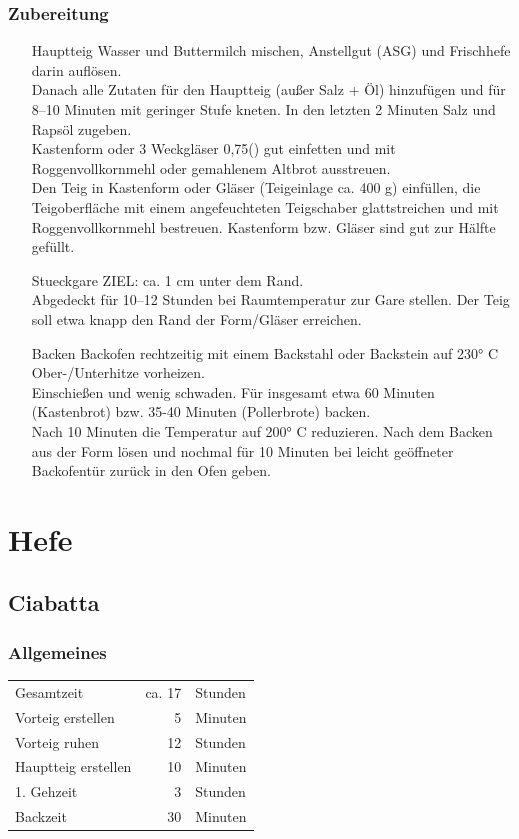 \subsection*{Zubereitung}
\begin{enumerate}
    \item  [\Gls{Hauptteig}]  Wasser und Buttermilch mischen, Anstellgut (ASG) und Frischhefe darin auflösen.\\
    Danach alle Zutaten für den Hauptteig (außer Salz + Öl) hinzufügen und für 8–10     Minuten mit geringer Stufe kneten. In den letzten 2  Minuten Salz und Rapsöl zugeben.\\
    Kastenform oder 3 Weckgläser 0,75() gut einfetten und mit Roggenvollkornmehl oder gemahlenem Altbrot ausstreuen.\\
    Den Teig in Kastenform oder Gläser (Teigeinlage ca. 400 g) einfüllen, die Teigoberfläche mit einem angefeuchteten Teigschaber glattstreichen und mit Roggenvollkornmehl bestreuen. Kastenform bzw. Gläser sind gut zur Hälfte gefüllt.
    \item [\Gls{Stueckgare}] ZIEL: ca. 1 cm unter dem Rand. \\
    Abgedeckt für 10–12 Stunden bei Raumtemperatur zur Gare stellen. Der Teig soll etwa knapp den Rand der Form/Gläser erreichen.
    \item [Backen]  Backofen rechtzeitig mit einem Backstahl oder Backstein auf 230° C Ober-/Unterhitze vorheizen.\\
    Einschießen und wenig schwaden. Für insgesamt etwa 60 Minuten (Kastenbrot) bzw. 35-40 Minuten (Pollerbrote) backen.\\
    Nach 10 Minuten die Temperatur auf 200° C reduzieren. Nach dem Backen aus der Form lösen und nochmal für 10 Minuten bei leicht geöffneter Backofentür zurück in den Ofen geben. 
\end{enumerate}


\chapter{Hefe}
\section{Ciabatta}  
\subsection*{Allgemeines}
\begin{tabular}{lrl}
    Gesamtzeit          & ca. 17 & Stunden \\
    Vorteig erstellen   &      5 & Minuten \\
    Vorteig ruhen       &     12 & Stunden \\
    Hauptteig erstellen &     10 & Minuten \\
    1. Gehzeit          &      3 & Stunden \\
    Backzeit            &     30 & Minuten
\end{tabular} 
